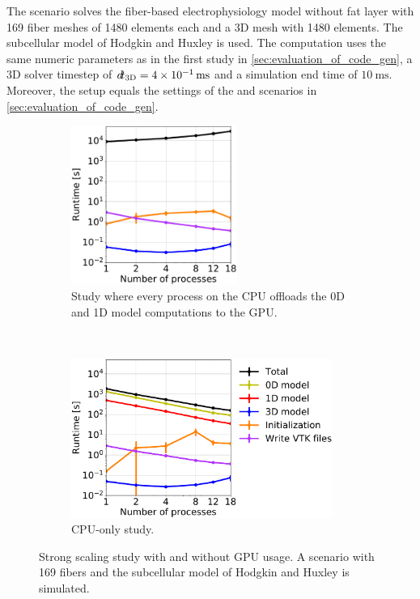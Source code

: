 The scenario solves the fiber-based electrophysiology model without fat layer with 169 fiber meshes of 1480 elements each and a 3D mesh with 1480 elements. The subcellular model of Hodgkin and Huxley \cite{Hodgkin1952} is used. The computation uses the same numeric parameters as in the first study in \cref{sec:evaluation_of_code_gen}, a 3D solver timestep of $\dt_\text{3D}=\SI{4e-01}{\ms}$ and a simulation end time of $\SI{10}{\ms}$. Moreover, the setup equals the settings of the  and  scenarios in \cref{sec:evaluation_of_code_gen}.

\begin{figure}%
  \centering%
  \begin{subfigure}[t]{0.45\textwidth}%
    \centering%
    \includegraphics[height=52mm]{images/results/studies/16_hodgkin_huxley_gpu.pdf}%
    \caption{Study where every process on the CPU offloads the 0D and 1D model computations to the GPU.}%
    \label{fig:16_hodgkin_huxley_gpu}%
  \end{subfigure}
  \,
  \begin{subfigure}[t]{0.53\textwidth}%
    \centering%
    \includegraphics[height=52mm]{images/results/studies/16_hodgkin_huxley_cpu.pdf}%
    \caption{CPU-only study.}%
    \label{fig:16_hodgkin_huxley_cpu}%
  \end{subfigure}   
  \caption{Strong scaling study with and without GPU usage. A scenario with 169 fibers and the subcellular model of Hodgkin and Huxley is simulated.}%
  \label{fig:16_hodgkin_huxley_cpu_gpu}%
\end{figure}%

